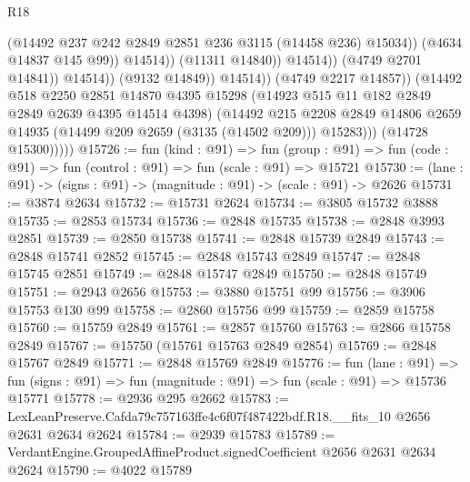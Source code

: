 \begin{lexlean}{R18}
\begin{coremodule}
                                          (@14492
                                            @237
                                            @242
                                            @2849
                                            @2851
                                            @236
                                            @3115
                                            (@14458 @236)
                                            @15034))
                                        (@4634 @14837 @145 @99))
                                      @14514))
                                  (@11311 @14840))
                                @14514))
                            (@4749 @2701 @14841))
                          @14514))
                      (@9132 @14849))
                    @14514))
                (@4749 @2217 @14857))
              (@14492
                @518
                @2250
                @2851
                @14870
                @4395
                @15298
                (@14923 @515 @11 @182 @2849 @2849 @2639 @4395 @14514 @4398)
                (@14492
                  @215
                  @2208
                  @2849
                  @14806
                  @2659
                  @14935
                  (@14499 @209 @2659 (@3135 (@14502 @209)))
                  @15283)))
            (@14728 @15300)))))
@15726 := fun (kind : @91) =>
  fun (group : @91) => fun (code : @91) => fun (control : @91) => fun (scale : @91) => @15721
@15730 := (lane : @91) -> (signs : @91) -> (magnitude : @91) -> (scale : @91) -> @2626
@15731 := @3874 @2634
@15732 := @15731 @2624
@15734 := @3805 @15732 @3888
@15735 := @2853 @15734
@15736 := @2848 @15735
@15738 := @2848 @3993 @2851
@15739 := @2850 @15738
@15741 := @2848 @15739 @2849
@15743 := @2848 @15741 @2852
@15745 := @2848 @15743 @2849
@15747 := @2848 @15745 @2851
@15749 := @2848 @15747 @2849
@15750 := @2848 @15749
@15751 := @2943 @2656
@15753 := @3880 @15751 @99
@15756 := @3906 @15753 @130 @99
@15758 := @2860 @15756 @99
@15759 := @2859 @15758
@15760 := @15759 @2849
@15761 := @2857 @15760
@15763 := @2866 @15758 @2849
@15767 := @15750 (@15761 @15763 @2849 @2854)
@15769 := @2848 @15767 @2849
@15771 := @2848 @15769 @2849
@15776 := fun (lane : @91) =>
  fun (signs : @91) => fun (magnitude : @91) => fun (scale : @91) => @15736 @15771
@15778 := @2936 @295 @2662
@15783 := LexLeanPreserve.Cafda79c757163ffe4c6f07f487422bdf.R18.__fits_10 @2656 @2631 @2634 @2624
@15784 := @2939 @15783
@15789 := VerdantEngine.GroupedAffineProduct.signedCoefficient @2656 @2631 @2634 @2624
@15790 := @4022 @15789

\end{coremodule}
\end{lexlean}
